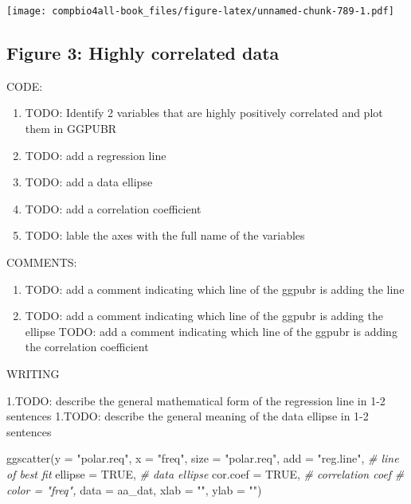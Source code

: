 \documentclass[
]{book}
\newenvironment{Shaded}{\begin{snugshade}}{\end{snugshade}}
\newcommand{\AttributeTok}[1]{\textcolor[rgb]{0.77,0.63,0.00}{#1}}
\newcommand{\CommentTok}[1]{\textcolor[rgb]{0.56,0.35,0.01}{\textit{#1}}}
\newcommand{\ConstantTok}[1]{\textcolor[rgb]{0.00,0.00,0.00}{#1}}
\newcommand{\FunctionTok}[1]{\textcolor[rgb]{0.00,0.00,0.00}{#1}}
\newcommand{\NormalTok}[1]{#1}
\newcommand{\StringTok}[1]{\textcolor[rgb]{0.31,0.60,0.02}{#1}}
\providecommand{\tightlist}{%
  \setlength{\itemsep}{0pt}\setlength{\parskip}{0pt}}
\begin{document}
\texttt{[image: compbio4all-book\_files/figure-latex/unnamed-chunk-789-1.pdf]}

\hypertarget{figure-3-highly-correlated-data-1}{%
\subsection{Figure 3: Highly correlated data}\label{figure-3-highly-correlated-data-1}}

CODE:

\begin{enumerate}
\def\labelenumi{\arabic{enumi}.}
\tightlist
\item
  TODO: Identify 2 variables that are highly positively correlated and plot them in GGPUBR
\item
  TODO: add a regression line
\item
  TODO: add a data ellipse
\item
  TODO: add a correlation coefficient
\item
  TODO: lable the axes with the full name of the variables
\end{enumerate}

COMMENTS:

\begin{enumerate}
\def\labelenumi{\arabic{enumi}.}
\tightlist
\item
  TODO: add a comment indicating which line of the ggpubr is adding the line
\item
  TODO: add a comment indicating which line of the ggpubr is adding the ellipse
  TODO: add a comment indicating which line of the ggpubr is adding the correlation coefficient
\end{enumerate}

WRITING

1.TODO: describe the general mathematical form of the regression line in 1-2 sentences
1.TODO: describe the general meaning of the data ellipse in 1-2 sentences

\begin{Shaded}
\begin{Highlighting}[]
\FunctionTok{ggscatter}\NormalTok{(}\AttributeTok{y =} \StringTok{"polar.req"}\NormalTok{,}
          \AttributeTok{x =} \StringTok{"freq"}\NormalTok{,}
          \AttributeTok{size =} \StringTok{"polar.req"}\NormalTok{,}
           \AttributeTok{add =} \StringTok{"reg.line"}\NormalTok{,  }\CommentTok{\# line of best fit}
           \AttributeTok{ellipse =} \ConstantTok{TRUE}\NormalTok{,   }\CommentTok{\# data ellipse}
          \AttributeTok{cor.coef =} \ConstantTok{TRUE}\NormalTok{, }\CommentTok{\# correlation coef}
         \CommentTok{\# color = "freq",}
          \AttributeTok{data =}\NormalTok{ aa\_dat,}
         \AttributeTok{xlab =} \StringTok{""}\NormalTok{,}
         \AttributeTok{ylab =} \StringTok{""}\NormalTok{)}
\end{Highlighting}
\end{Shaded}
\end{document}
